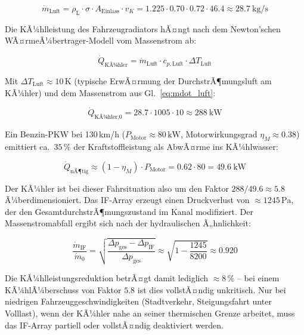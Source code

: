 ﻿\documentclass[12pt, a4paper]{report}
\theoremstyle{definition}
\theoremstyle{remark}
\newcommand{\rhoL}{\rho_{\text{L}}}
\newcommand{\Aeinlass}{A_{\text{Einlass}}}
\begin{document}
\begin{equation}
  \dot{m}_{\text{Luft}} = \rhoL \cdot \sigma \cdot \Aeinlass \cdot v_K
  = 1.225 \cdot 0.70 \cdot 0.72 \cdot 46.4 \approx \SI{28.7}{\kilo\gram\per\second}
  \label{eq:mdot_luft}
\end{equation}

Die KÃ¼hlleistung des Fahrzeugradiators hÃ¤ngt nach dem Newton'schen
WÃ¤rmeÃ¼bertrager-Modell vom Massenstrom ab:

\begin{equation}
  \dot{Q}_{\text{KÃ¼hler}} = \dot{m}_{\text{Luft}} \cdot c_{p,\text{Luft}} \cdot \Delta T_{\text{Luft}}
  \label{eq:q_kuehler}
\end{equation}

Mit $\Delta T_{\text{Luft}} \approx 10\,\text{K}$ (typische ErwÃ¤rmung der
DurchstrÃ¶mungsluft am KÃ¼hler) und dem Massenstrom aus Gl.~\eqref{eq:mdot_luft}:

\begin{equation}
  \dot{Q}_{\text{KÃ¼hler,0}} = 28.7 \cdot 1005 \cdot 10 \approx \SI{288}{\kilo\watt}
  \label{eq:q_kuehler_0}
\end{equation}

Ein Benzin-PKW bei 130\,km/h ($P_{\text{Motor}} \approx 80\,\text{kW}$,
Motorwirkungsgrad $\eta_M \approx 0.38$) emittiert ca.\ $35\,\%$ der
Kraftstoffleistung als AbwÃ¤rme ins KÃ¼hlwasser:

\begin{equation}
  \dot{Q}_{\text{nÃ¶tig}} \approx (1 - \eta_M) \cdot P_{\text{Motor}}
  = 0.62 \cdot 80 = \SI{49.6}{\kilo\watt}
  \label{eq:q_noetig}
\end{equation}

Der KÃ¼hler ist bei dieser Fahrsituation also um den Faktor $288/49.6 \approx 5.8$
Ã¼berdimensioniert. Das IF-Array erzeugt einen Druckverlust von $\approx 1245\,\text{Pa}$,
der den GesamtdurchstrÃ¶mungszustand im Kanal modifiziert. Der Massenstromabfall
ergibt sich nach der hydraulischen Ã„hnlichkeit:

\begin{equation}
  \frac{\dot{m}_{\text{IF}}}{\dot{m}_0}
  = \sqrt{\frac{\Delta p_{\text{ges}} - \Delta p_{\text{IF}}}{\Delta p_{\text{ges}}}}
  \approx \sqrt{1 - \frac{1245}{8200}} \approx 0.920
  \label{eq:massenstrom_ratio}
\end{equation}

Die KÃ¼hlleistungsreduktion betrÃ¤gt damit lediglich $\approx 8\,\%$ --
bei einem KÃ¼hlÃ¼berschuss von Faktor $5.8$ ist dies vollstÃ¤ndig unkritisch.
Nur bei niedrigen Fahrzeuggeschwindigkeiten (Stadtverkehr, Steigungsfahrt
unter Volllast), wenn der KÃ¼hler nahe an seiner thermischen Grenze arbeitet,
muss das IF-Array partiell oder vollstÃ¤ndig deaktiviert werden.
\end{document}
